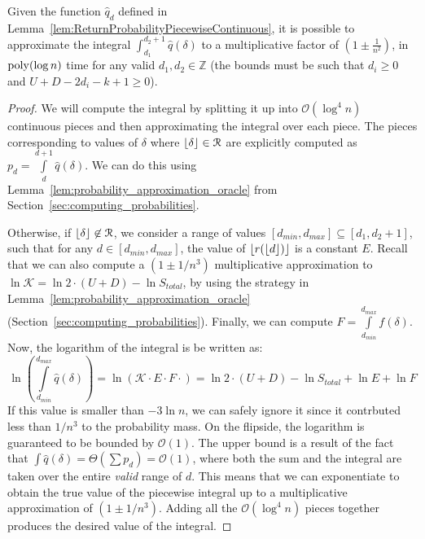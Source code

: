 \begin{lemma}
\label{lem:ReturnProbabilityPiecewiseContinuousIntegral}
Given the function $\hat q_d$ defined in Lemma~\ref{lem:ReturnProbabilityPiecewiseContinuous},
it is possible to approximate the integral $\int_{d_1}^{d_2+1} \hat q(\delta)$ to a multiplicative factor of $\left( 1\pm \frac{1}{n^2} \right)$,
in $\mathrm{poly}(\log n)$ time for any valid $d_1, d_2\in \mathbb Z$ (the bounds must be such that $d_i \ge 0$ and $U+D-2d_i-k+1 \ge 0$).
\end{lemma}
\begin{proof}
We will compute the integral by splitting it up into $\mathcal O(\log^4 n)$ continuous pieces and then approximating the integral over each piece.
The pieces corresponding to values of $\delta$ where $\lfloor\delta\rfloor\in \mathcal R$
are explicitly computed as $p_d = \int\limits_d^{d+1} \hat q(\delta)$.
We can do this using Lemma~\ref{lem:probability_approximation_oracle} from Section~\ref{sec:computing_probabilities}.

Otherwise, if $\lfloor\delta\rfloor\not\in \mathcal R$, we consider a range of values $[d_{min}, d_{max}]\subseteq [d_1, d_2+1]$,
such that for any $d\in [d_{min}, d_{max}]$, the value of $\lfloor r(\lfloor d\rfloor)\rfloor$ is a constant $E$.
Recall that we can also compute a $\left( 1\pm 1/n^3\right)$ multiplicative approximation to $\ln \mathcal K = \ln 2\cdot(U + D) - \ln S_{total}$,
by using the strategy in Lemma~\ref{lem:probability_approximation_oracle} (Section~\ref{sec:computing_probabilities}).
Finally, we can compute $F = \int\limits_{d_{min}}^{d_{max}} f(\delta)$.
Now, the logarithm of the integral is be written as:
\[
\ln\left( \int\limits_{d_{min}}^{d_{max}} \hat q(\delta)\right) = \ln \left( \mathcal K\cdot E\cdot F\cdot\right)
= \ln 2\cdot(U + D) - \ln S_{total} + \ln E + \ln F
\]
If this value is smaller than $-3\ln n$, we can safely ignore it since it contrbuted less than $1/n^3$ to the probability mass.
On the flipside, the logarithm is guaranteed to be bounded by $\mathcal O(1)$.
The upper bound is a result of the fact that $\int \hat q(\delta) = \Theta(\sum p_d) = \mathcal O(1)$,
where both the sum and the integral are taken over the entire \emph{valid} range of $d$.
This means that we can exponentiate to obtain the true value of the piecewise integral up to a multiplicative approximation of $(1\pm 1/n^3)$.
Adding all the $\mathcal O(\log^4 n)$ pieces together produces the desired value of the integral.
\end{proof}


